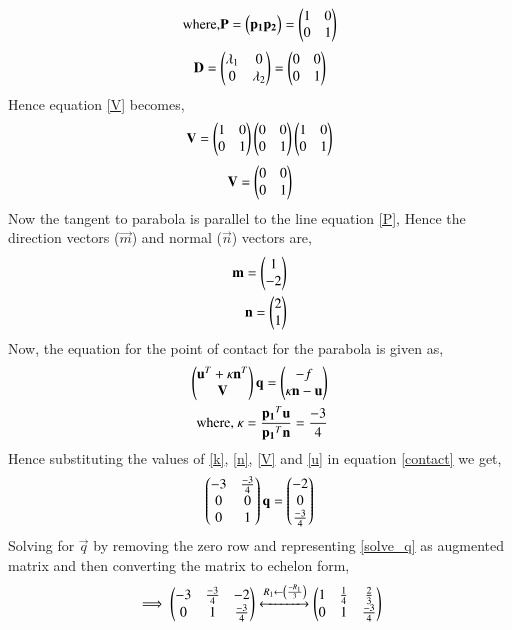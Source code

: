 \documentclass[journal,12pt,twocolumn]{IEEEtran}
\begin{document}
\begin{align}
\mbox{where,} \mathbf{P} = \begin{pmatrix}\mathbf{p_1} \mathbf{p_2}\end{pmatrix} = \begin{pmatrix}1&0\\0&1\end{pmatrix}
\end{align}
\begin{align}
\mathbf{D} = \begin{pmatrix}\lambda_1&0\\0&\lambda_2\end{pmatrix} = \begin{pmatrix}0&0\\0&1\end{pmatrix}
\end{align}
Hence equation \eqref{V} becomes,
\begin{align}
\mathbf{V} = \begin{pmatrix}1&0\\0&1\end{pmatrix}\begin{pmatrix}0&0\\0&1\end{pmatrix}\begin{pmatrix}1&0\\0&1\end{pmatrix}
\end{align}
\begin{align}
\mathbf{V} = \begin{pmatrix}0&0\\0&1\end{pmatrix}
\end{align}
Now the tangent to parabola is parallel to the line equation \eqref{P}, Hence the direction vectors ($\vec{m}$) and normal ($\vec{n}$)  vectors are,
\begin{align}
\mathbf{m} = \begin{pmatrix}1\\-2\end{pmatrix}\\
\mathbf{n} = \begin{pmatrix}2\\1\end{pmatrix}\label{n}
\end{align} 
Now, the equation for the point of contact for the parabola is given as,
\begin{align}
\begin{pmatrix}\mathbf{u}^T+\kappa\mathbf{n}^T\\\mathbf{V}\end{pmatrix}\mathbf{q} = \begin{pmatrix}-f\\\kappa\mathbf{n}-\mathbf{u}\end{pmatrix}\label{contact}\\
\mbox{where, } \kappa = \frac{\mathbf{p_1}^T\mathbf{u}}{\mathbf{p_1}^T\mathbf{n}} = \frac{-3}{4} \label{k}
\end{align}
Hence substituting the values of \eqref{k}, \eqref{n}, \eqref{V} and \eqref{u} in equation \eqref{contact} we get,
\begin{align}
\begin{pmatrix}-3&\frac{-3}{4}\\0&0\\0&1\end{pmatrix}\mathbf{q} = \begin{pmatrix}-2\\0\\\frac{-3}{4}\end{pmatrix}
\label{solve_q}
\end{align}
Solving for $\vec{q}$ by removing the zero row and representing \eqref{solve_q} as augmented matrix and then converting the matrix to echelon form,
\begin{align}
\implies \begin{pmatrix}-3&\frac{-3}{4}&-2\\0&1&\frac{-3}{4}\end{pmatrix} \xleftrightarrow[]{R_1\leftarrow\ensuremath{\left(\frac{-R_1}{3}\right)}} \begin{pmatrix}1&\frac{1}{4}&\frac{2}{3}\\0&1&\frac{-3}{4}\end{pmatrix}
\end{align}
\end{document}
